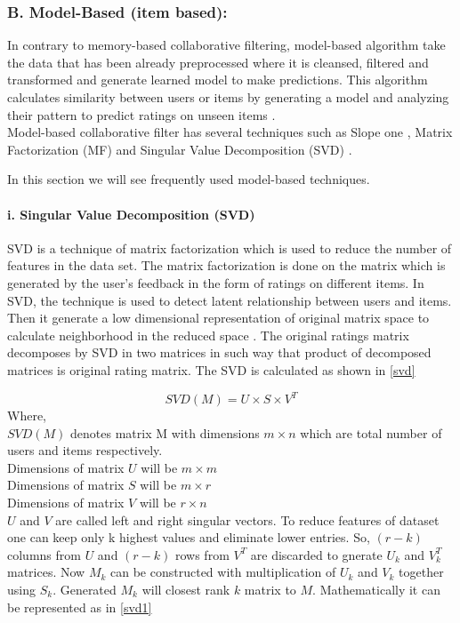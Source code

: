\subsubsection{B. Model-Based (item based):}
In contrary to memory-based collaborative filtering, model-based algorithm take the data that has been already preprocessed where it is cleansed, filtered and transformed and generate learned model to make predictions. This algorithm calculates similarity between users or items by generating a model and analyzing their pattern to predict ratings on unseen items \cite{28,29,30} .
\\
Model-based collaborative filter has several techniques such as Slope one \cite{31}, Matrix Factorization (MF) and Singular Value Decomposition (SVD) \cite{28}. 

In this section we will see frequently used model-based techniques.
\\

\paragraph{i. Singular Value Decomposition (SVD) }
SVD is a technique of matrix factorization which is used to reduce the number of features in the data set. The matrix factorization is done on the matrix which is generated by the user's feedback in the form of ratings on different items. In SVD, the technique is used to detect latent relationship between users and items. Then it generate a low dimensional representation of original matrix space to calculate neighborhood in the reduced space \cite{32}. The original ratings matrix decomposes by SVD in two matrices in such way that product of decomposed matrices is original rating matrix. The SVD is calculated as shown in \autoref{svd}

\begin{equation}
SVD(M) = U \times S \times V^{T} 
\label{svd}
\end{equation}
\noindent Where,\\
$SVD(M)$ denotes matrix M with dimensions $m \times n$ which are total number of users and items respectively.\\
Dimensions of matrix $U$ will be $m \times m$ \\
Dimensions of matrix $S$ will be $m \times r$ \\
Dimensions of matrix $V$ will be $r \times n$ \\
$U$ and $V$ are called left and right singular vectors. To reduce features of dataset one can keep only k highest values and eliminate lower entries. So, $(r-k)$ columns from $U$ and $(r-k)$ rows from $V^{T}$ are discarded to gnerate $U_{k}$ and $V_{k}^{T}$ matrices. Now $M_{k}$ can be constructed with multiplication of $U_{k}$ and $V_{k}$ together using $S_{k}$. Generated $M_{k}$ will closest rank $k$ matrix to $M$. Mathematically it can be represented as in \autoref{svd1}

